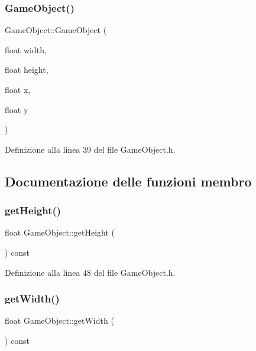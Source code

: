\subsubsection{\texorpdfstring{Game\+Object()}{GameObject()}\hspace{0.1cm}{\footnotesize\ttfamily [2/2]}}
{\footnotesize\ttfamily Game\+Object\+::\+Game\+Object (\begin{DoxyParamCaption}\item[{float}]{width,  }\item[{float}]{height,  }\item[{float}]{x,  }\item[{float}]{y }\end{DoxyParamCaption})\hspace{0.3cm}{\ttfamily [inline]}}



Definizione alla linea 39 del file Game\+Object.\+h.



\subsection{Documentazione delle funzioni membro}
\mbox{\label{class_game_object_a927400453a0989e2f5b765031f4d861c}} 
\subsubsection{\texorpdfstring{get\+Height()}{getHeight()}}
{\footnotesize\ttfamily float Game\+Object\+::get\+Height (\begin{DoxyParamCaption}{ }\end{DoxyParamCaption}) const\hspace{0.3cm}{\ttfamily [inline]}}



Definizione alla linea 48 del file Game\+Object.\+h.

\mbox{\label{class_game_object_a665147ee46e9b62442b2d6b9835c4dd4}} 
\subsubsection{\texorpdfstring{get\+Width()}{getWidth()}}
{\footnotesize\ttfamily float Game\+Object\+::get\+Width (\begin{DoxyParamCaption}{ }\end{DoxyParamCaption}) const\hspace{0.3cm}{\ttfamily [inline]}}



